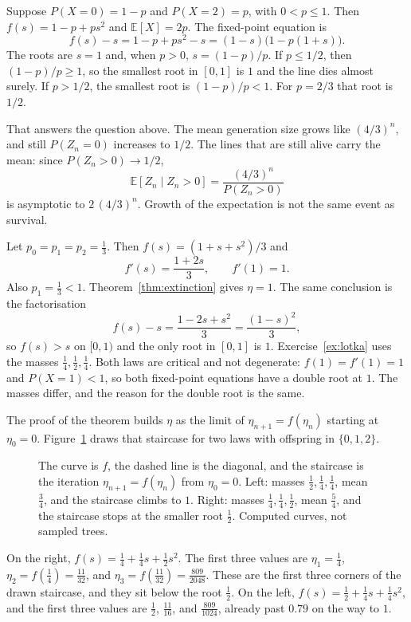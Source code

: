 \begin{example}\label{ex:binary}
Suppose $P(X=0)=1-p$ and $P(X=2)=p$, with $0<p\le1$. Then $f(s)=1-p+ps^2$ and $\mathbb E[X]=2p$. The fixed-point equation is
\[
 f(s)-s=1-p+ps^2-s=(1-s)\bigl(1-p(1+s)\bigr).
\]
The roots are $s=1$ and, when $p>0$, $s=(1-p)/p$. If $p\le1/2$, then $(1-p)/p\ge1$, so the smallest root in $[0,1]$ is $1$ and the line dies almost surely. If $p>1/2$, the smallest root is $(1-p)/p<1$. For $p=2/3$ that root is $1/2$.

That answers the question above. The mean generation size grows like $(4/3)^n$, and still $P(Z_n=0)$ increases to $1/2$. The lines that are still alive carry the mean: since $P(Z_n>0)\to1/2$,
\[
 \mathbb E[Z_n\mid Z_n>0]=\frac{(4/3)^n}{P(Z_n>0)}
\]
is asymptotic to $2\,(4/3)^n$. Growth of the expectation is not the same event as survival.
\end{example}

\begin{example}\label{ex:thirds}
Let $p_0=p_1=p_2=\tfrac13$. Then $f(s)=(1+s+s^2)/3$ and
\[
 f'(s)=\frac{1+2s}3,\qquad f'(1)=1.
\]
Also $p_1=\tfrac13<1$. Theorem~\ref{thm:extinction} gives $\eta=1$. The same conclusion is the factorisation
\[
 f(s)-s=\frac{1-2s+s^2}3=\frac{(1-s)^2}3,
\]
so $f(s)>s$ on $[0,1)$ and the only root in $[0,1]$ is $1$. Exercise~\ref{ex:lotka} uses the masses $\tfrac14,\tfrac12,\tfrac14$. Both laws are critical and not degenerate: $f(1)=f'(1)=1$ and $P(X=1)<1$, so both fixed-point equations have a double root at $1$. The masses differ, and the reason for the double root is the same.
\end{example}

The proof of the theorem builds $\eta$ as the limit of $\eta_{n+1}=f(\eta_n)$ starting at $\eta_0=0$. Figure~\ref{fig:cobweb} draws that staircase for two laws with offspring in $\{0,1,2\}$.

\begin{figure}[ht]
\centering
{}
\caption{The curve is $f$, the dashed line is the diagonal, and the staircase is the iteration $\eta_{n+1}=f(\eta_n)$ from $\eta_0=0$. Left: masses $\tfrac12,\tfrac14,\tfrac14$, mean $\tfrac34$, and the staircase climbs to $1$. Right: masses $\tfrac14,\tfrac14,\tfrac12$, mean $\tfrac54$, and the staircase stops at the smaller root $\tfrac12$. Computed curves, not sampled trees.}
\label{fig:cobweb}
\end{figure}

On the right, $f(s)=\tfrac14+\tfrac14 s+\tfrac12 s^2$. The first three values are $\eta_1=\tfrac14$, $\eta_2=f(\tfrac14)=\tfrac{11}{32}$, and $\eta_3=f(\tfrac{11}{32})=\tfrac{809}{2048}$. These are the first three corners of the drawn staircase, and they sit below the root $\tfrac12$. On the left, $f(s)=\tfrac12+\tfrac14 s+\tfrac14 s^2$, and the first three values are $\tfrac12$, $\tfrac{11}{16}$, and $\tfrac{809}{1024}$, already past $0.79$ on the way to $1$.


